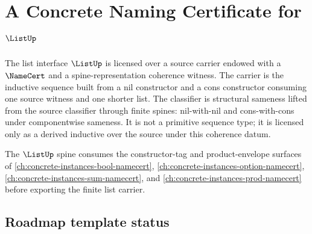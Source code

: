 \chapter{A Concrete Naming Certificate for \(\ListUp\)}
\label{ch:concrete-instances-list-namecert}

The list interface $\ListUp$ is licensed over a source carrier endowed with a $\NameCert$ and a spine-representation coherence witness. The carrier is the inductive sequence built from a nil constructor and a cons constructor consuming one source witness and one shorter list. The classifier is structural sameness lifted from the source classifier through finite spines: nil-with-nil and cons-with-cons under componentwise sameness. It is not a primitive sequence type; it is licensed only as a derived inductive over the source under this coherence datum.

The $\ListUp$ spine consumes the constructor-tag and product-envelope surfaces of \autoref{ch:concrete-instances-bool-namecert}, \autoref{ch:concrete-instances-option-namecert}, \autoref{ch:concrete-instances-sum-namecert}, and \autoref{ch:concrete-instances-prod-namecert} before exporting the finite list carrier.

\section{Roadmap template status}

